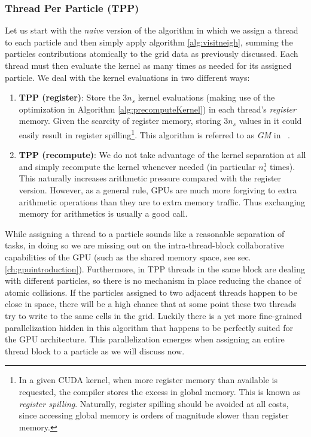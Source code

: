 \documentclass[ twoside,openright,titlepage,numbers=noenddot,%
headinclude,footinclude,cleardoublepage=empty,abstract=on,
BCOR=5mm,paper=b5,fontsize=11pt, dvipsnames
]{scrreprt}
\begin{document}
\subsubsection*{Thread Per Particle (TPP)}
Let us start with the \emph{naive} version of the algorithm in which we assign a thread to each particle and then simply apply algorithm \ref{alg:visitneigh}, summing the particles contributions atomically to the grid data as previously discussed. Each thread must then evaluate the kernel as many times as needed for its assigned particle. We deal with the kernel evaluations in two different ways:
\begin{enumerate}
\item \textbf{TPP (register)}: Store the $3n_s$ kernel evaluations (making use of the optimization in Algorithm \ref{alg:precomputeKernel}) in each thread's \emph{register} memory. Given the scarcity of register memory, storing $3n_s$ values in it could easily result in register spilling\footnote{In a given CUDA kernel, when more register memory than available is requested, the compiler stores the excess in global memory. This is known as \emph{register spilling}. Naturally, register spilling should be avoided at all costs, since accessing global memory is orders of magnitude slower than register memory.}. This algorithm is referred to as \emph{GM} in ~\cite{Shih2021}.
\item \textbf{TPP (recompute)}: We do not take advantage of the kernel separation at all and simply recompute the kernel whenever needed (in particular $n_s^3$ times). This naturally increases arithmetic pressure compared with the register version. However, as a general rule, GPUs are much more forgiving to extra arithmetic operations than they are to extra memory traffic. Thus exchanging memory for arithmetics is usually a good call.
\end{enumerate}
While assigning a thread to a particle sounds like a reasonable separation of tasks, in doing so we are missing out on the intra-thread-block collaborative capabilities of the GPU (such as the shared memory space, see sec. \ref{ch:gpuintroduction}). Furthermore, in TPP threads in the same block are dealing with different particles, so there is no mechanism in place reducing the chance of atomic collisions. If the particles assigned to two adjacent threads happen to be close in space, there will be a high chance that at some point these two threads try to write to the same cells in the grid. Luckily there is a yet more fine-grained parallelization hidden in this algorithm that happens to be perfectly suited for the GPU architecture. This parallelization emerges when assigning an entire thread block to a particle as we will discuss now.
\end{document}
